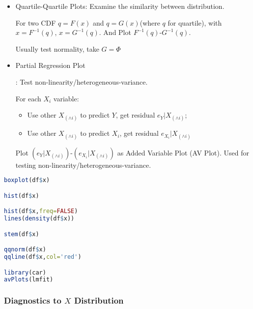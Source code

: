 \begin{itemize}[topsep=2pt,itemsep=2pt]
        \item Quartile-Quartile Plots\hypertarget{QQplot}{}: Examine the similarity  between distribution.
            
        For two CDF $ q=F(x) $ and $ q=G(x) $(where $ q $ for quartile), with $ x=F^{-1}(q) $, $ x=G^{-1}(q) $. And Plot $ F^{-1}(q) $-$ G^{-1}(q) $.

        Usually test normality, take $ G=\Phi  $



        \item \hypertarget{AVPlot}{Partial Regression Plot}: Test non-linearity/heterogeneous-variance.
    
        For each $ X_i $ variable: 
        \begin{itemize}[topsep=2pt,itemsep=0pt]
            \item Use other $ X_{(\wedge i)} $ to predict $ Y $, get residual $ e_Y|X_{(\wedge i)} $;
            \item Use other $ X_{(\wedge i)} $ to predict $ X_i $, get residual $ e_{X_i}|X_{(\wedge i)} $
        \end{itemize}
        
        Plot $ (e_Y|X_{(\wedge i)}) $-$ (e_{X_i}|X_{(\wedge i)}) $ as Added Variable Plot (AV Plot). Used for testing non-linearity/heterogeneous-variance.
    \end{itemize}

     
\begin{rcode}
\begin{lstlisting}[language=R]
boxplot(df$x)

hist(df$x)

hist(df$x,freq=FALSE)
lines(density(df$x))

stem(df$x)

qqnorm(df$x)
qqline(df$x,col='red')

library(car)
avPlots(lmfit)
\end{lstlisting}

\end{rcode}




    
\subsubsection{Diagnostics to $ X $ Distribution}\label{SubSecXDiagnostics}





